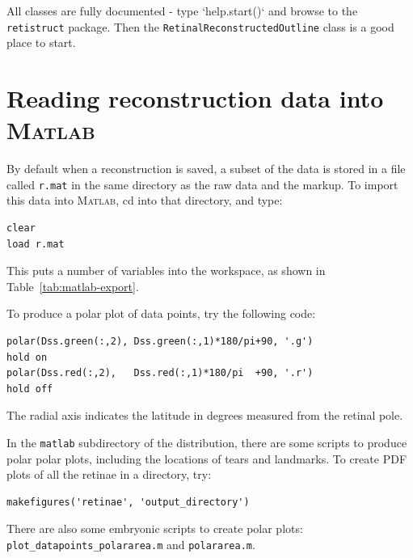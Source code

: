 \documentclass{book}
\begin{document}
All classes are fully documented - type `help.start()` and browse to
the \texttt{retistruct} package. Then the \texttt{RetinalReconstructedOutline}
class is a good place to start.



\section{Reading reconstruction data into \textsc{Matlab}}
\label{retistruct-manual:sec:export-reconstr-data}

By default when a reconstruction is saved, a subset of the data is
stored in a file called \texttt{r.mat} in the same directory as the
raw data and the markup. To import this data into \textsc{Matlab}, cd
into that directory, and type:
\begin{verbatim}
clear
load r.mat
\end{verbatim}
This puts a number of variables into the workspace, as shown in
Table~\ref{tab:matlab-export}.

To produce a polar plot of data points, try the following code:
\begin{verbatim}
polar(Dss.green(:,2), Dss.green(:,1)*180/pi+90, '.g')
hold on
polar(Dss.red(:,2),   Dss.red(:,1)*180/pi  +90, '.r')
hold off
\end{verbatim}
The radial axis indicates the latitude in degrees measured from the
retinal pole.

In the \texttt{matlab} subdirectory of the distribution, there are
some scripts to produce polar polar plots, including the locations of
tears and landmarks. To create PDF plots of all the retinae in a
directory, try:
\begin{verbatim}
makefigures('retinae', 'output_directory')
\end{verbatim}

There are also some embryonic scripts to create polar plots:
\texttt{plot\_datapoints\_polararea.m} and \texttt{polararea.m}.
\end{document}
